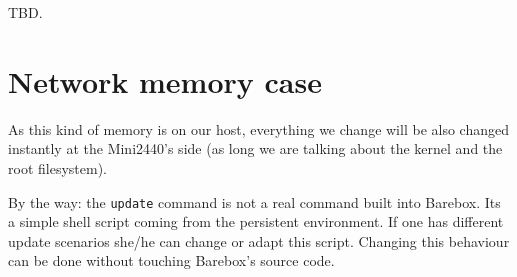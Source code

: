 TBD.

\section{Network memory case}

As this kind of memory is on our host, everything we change will be also
changed instantly at the Mini2440's side (as long we are talking about the
kernel and the root filesystem).

By the way: the \texttt{update} command is not a real command built into
Barebox. Its a simple shell script coming from the persistent environment.
If one has different update scenarios she/he can change or adapt this script.
Changing this behaviour can be done without touching Barebox's source code.

%
